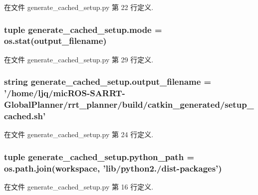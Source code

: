 在文件 generate\-\_\-cached\-\_\-setup.\-py 第 22 行定义.

\hypertarget{namespacegenerate__cached__setup_afd1a431f16a2a78ef0438a658e4ac3cf}{
\subsubsection[{mode}]{\setlength{\rightskip}{0pt plus 5cm}tuple generate\-\_\-cached\-\_\-setup.\-mode = os.\-stat({\bf output\-\_\-filename})}}\label{namespacegenerate__cached__setup_afd1a431f16a2a78ef0438a658e4ac3cf}


在文件 generate\-\_\-cached\-\_\-setup.\-py 第 29 行定义.

\hypertarget{namespacegenerate__cached__setup_a0265aee5075ee1eb701ff69c98ad6793}{
\subsubsection[{output\-\_\-filename}]{\setlength{\rightskip}{0pt plus 5cm}string generate\-\_\-cached\-\_\-setup.\-output\-\_\-filename = '/home/ljq/mic\-R\-O\-S-\/S\-A\-R\-R\-T-\/Global\-Planner/rrt\-\_\-planner/build/catkin\-\_\-generated/setup\-\_\-cached.\-sh'}}\label{namespacegenerate__cached__setup_a0265aee5075ee1eb701ff69c98ad6793}


在文件 generate\-\_\-cached\-\_\-setup.\-py 第 24 行定义.

\hypertarget{namespacegenerate__cached__setup_a770288702e38f06cf1b86a33bc07723e}{
\subsubsection[{python\-\_\-path}]{\setlength{\rightskip}{0pt plus 5cm}tuple generate\-\_\-cached\-\_\-setup.\-python\-\_\-path = os.\-path.\-join(workspace, 'lib/python2./dist-\/packages')}}\label{namespacegenerate__cached__setup_a770288702e38f06cf1b86a33bc07723e}


在文件 generate\-\_\-cached\-\_\-setup.\-py 第 16 行定义.

